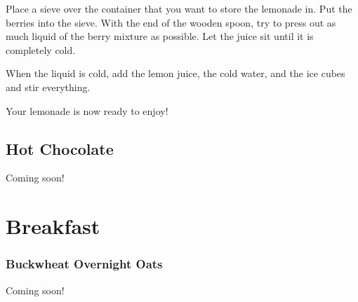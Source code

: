 \documentclass[twocolumn]{article}
\begin{document}
Place a sieve over the container that you want to store the lemonade in. Put the berries into the sieve. With the end of the wooden spoon, try to press out as much liquid of the berry mixture as possible. Let the juice sit until it is completely cold.
	
When the liquid is cold, add the lemon juice, the cold water, and the ice cubes and stir everything. 
	
Your lemonade is now ready to enjoy!
	
\subsection[Chocoho!]{Hot Chocolate}
Coming soon!

\section*{Breakfast}

\subsubsection{Buckwheat Overnight Oats}
Coming soon!
	
\end{document}
